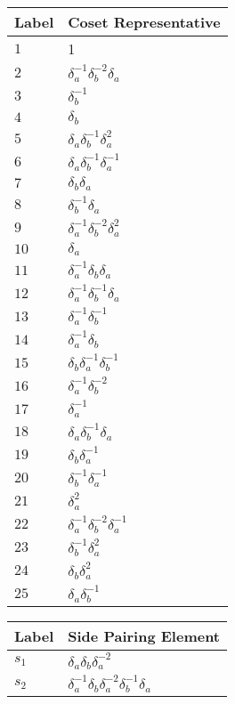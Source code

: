 \documentclass{article}
\begin{document}

\begin{center}
\begin{tabular}{ll}
\toprule
Label & Coset Representative\\
\midrule
$1$ & 1 \\
$2$ & $\delta_a^{-1}\delta_b^{-2}\delta_a^{}$ \\
$3$ & $\delta_b^{-1}$ \\
$4$ & $\delta_b^{}$ \\
$5$ & $\delta_a^{}\delta_b^{-1}\delta_a^{2}$ \\
$6$ & $\delta_a^{}\delta_b^{-1}\delta_a^{-1}$ \\
$7$ & $\delta_b^{}\delta_a^{}$ \\
$8$ & $\delta_b^{-1}\delta_a^{}$ \\
$9$ & $\delta_a^{-1}\delta_b^{-2}\delta_a^{2}$ \\
$10$ & $\delta_a^{}$ \\
$11$ & $\delta_a^{-1}\delta_b^{}\delta_a^{}$ \\
$12$ & $\delta_a^{-1}\delta_b^{-1}\delta_a^{}$ \\
$13$ & $\delta_a^{-1}\delta_b^{-1}$ \\
$14$ & $\delta_a^{-1}\delta_b^{}$ \\
$15$ & $\delta_b^{}\delta_a^{-1}\delta_b^{-1}$ \\
$16$ & $\delta_a^{-1}\delta_b^{-2}$ \\
$17$ & $\delta_a^{-1}$ \\
$18$ & $\delta_a^{}\delta_b^{-1}\delta_a^{}$ \\
$19$ & $\delta_b^{}\delta_a^{-1}$ \\
$20$ & $\delta_b^{-1}\delta_a^{-1}$ \\
$21$ & $\delta_a^{2}$ \\
$22$ & $\delta_a^{-1}\delta_b^{-2}\delta_a^{-1}$ \\
$23$ & $\delta_b^{-1}\delta_a^{2}$ \\
$24$ & $\delta_b^{}\delta_a^{2}$ \\
$25$ & $\delta_a^{}\delta_b^{-1}$ \\
\bottomrule
\end{tabular}
\hfill
\begin{tabular}{ll}
\toprule
Label & Side Pairing Element\\
\midrule
$s_{1}$ & $\delta_a^{}\delta_b^{}\delta_a^{-2}$ \\
$s_{2}$ & $\delta_a^{-1}\delta_b^{}\delta_a^{-2}\delta_b^{-1}\delta_a^{}$ \\

\end{tabular}
\end{center}
\end{document}
